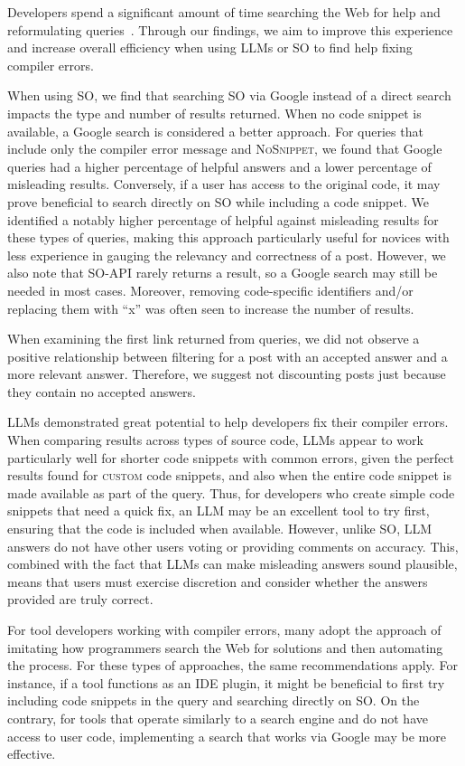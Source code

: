 \documentclass[preprint,12pt]{elsarticle}
\begin{document}
Developers spend a significant amount of time searching the Web for help and reformulating queries~\cite{r3, r5, r13}. Through our findings, we aim to improve this experience and increase overall efficiency when using LLMs or SO to find help fixing compiler errors.

When using SO, we find that searching SO via Google instead of a direct search impacts the type and number of results returned. When no code snippet is available, a Google search is considered a better approach. For queries that include only the compiler error message and \textsc{NoSnippet}, we found that Google queries had a higher percentage of helpful answers and a lower percentage of misleading results. Conversely, if a user has access to the original code, it may prove beneficial to search directly on SO while including a code snippet. We identified a notably higher percentage of helpful against misleading results for these types of queries, making this approach particularly useful for novices with less experience in gauging the relevancy and correctness of a post. However, we also note that \textsc{SO-API} rarely returns a result, so a Google search may still be needed in most cases. Moreover, removing code-specific identifiers and/or replacing them with ``x'' was often seen to increase the number of results.

When examining the first link returned from queries, we did not observe a positive relationship between filtering for a post with an accepted answer and a more relevant answer. Therefore, we suggest not discounting posts just because they contain no accepted answers.

LLMs demonstrated great potential to help developers fix their compiler errors. When comparing results across types of source code, LLMs appear to work particularly well for shorter code snippets with common errors, given the perfect results found for \textsc{custom} code snippets, and also when the entire code snippet is made available as part of the query. Thus, for developers who create simple code snippets that need a quick fix, an LLM may be an excellent tool to try first, ensuring that the code is included when available. However, unlike SO, LLM answers do not have other users voting or providing comments on accuracy. This, combined with the fact that LLMs can make misleading answers sound plausible, means that users must exercise discretion and consider whether the answers provided are truly correct.

For tool developers working with compiler errors, many adopt the approach of imitating how programmers search the Web for solutions and then automating the process. For these types of approaches, the same recommendations apply. For instance, if a tool functions as an IDE plugin, it might be beneficial to first try including code snippets in the query and searching directly on SO. On the contrary, for tools that operate similarly to a search engine and do not have access to user code, implementing a search that works via Google may be more effective.
\end{document}
